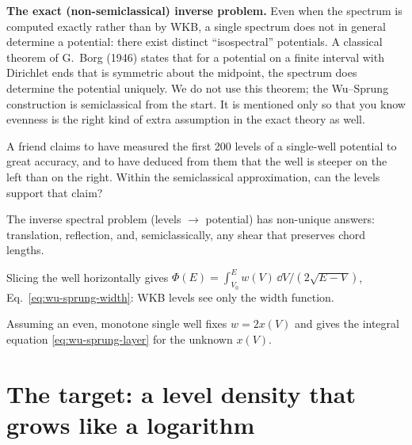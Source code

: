 \begin{beyond}
\textbf{The exact (non-semiclassical) inverse problem.} Even when the spectrum is computed exactly rather than by WKB, a single spectrum does not in general determine a potential: there exist distinct ``isospectral'' potentials. A classical theorem of G.~Borg (1946) states that for a potential on a finite interval with Dirichlet ends that is symmetric about the midpoint, the spectrum does determine the potential uniquely. We do not use this theorem; the Wu--Sprung construction is semiclassical from the start. It is mentioned only so that you know evenness is the right kind of extra assumption in the exact theory as well.
\end{beyond}

\begin{checkpoint}
A friend claims to have measured the first 200 levels of a single-well potential to great accuracy, and to have deduced from them that the well is steeper on the left than on the right. Within the semiclassical approximation, can the levels support that claim?
\end{checkpoint}

\begin{keyideas}
\item The inverse spectral problem (levels $\to$ potential) has non-unique answers: translation, reflection, and, semiclassically, any shear that preserves chord lengths.
\item Slicing the well horizontally gives $\Phi(E)=\int_{V_0}^{E}w(V)\,\dd V/(2\sqrt{E-V})$, Eq.~\eqref{eq:wu-sprung-width}: WKB levels see only the width function.
\item Assuming an even, monotone single well fixes $w=2x(V)$ and gives the integral equation \eqref{eq:wu-sprung-layer} for the unknown $x(V)$.
\end{keyideas}

\section{The target: a level density that grows like a logarithm}\label{sec:wu-sprung-target}

